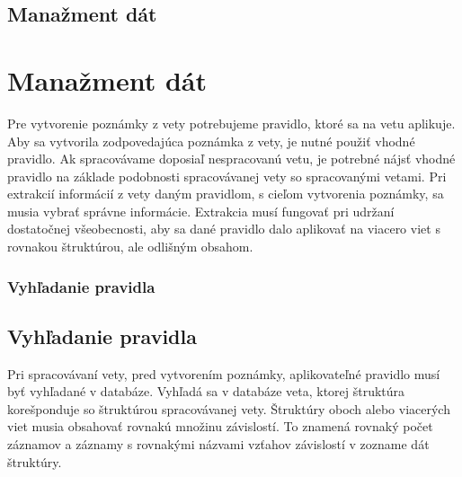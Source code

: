%
%
{
	\subsection{Manažment dát}
}
{
	\section{Manažment dát}
}
\label{subsection:data_management}
Pre vytvorenie poznámky z vety potrebujeme pravidlo, ktoré sa na vetu aplikuje. Aby sa vytvorila zodpovedajúca poznámka z vety, je nutné použiť vhodné pravidlo. Ak spracovávame doposiaľ nespracovanú vetu, je potrebné nájsť vhodné pravidlo na základe podobnosti spracovávanej vety so spracovanými vetami. Pri extrakcií informácií z vety daným pravidlom, s cieľom vytvorenia poznámky, sa musia vybrať správne informácie. Extrakcia musí fungovať pri udržaní dostatočnej všeobecnosti, aby sa dané pravidlo dalo aplikovať na viacero viet s rovnakou štruktúrou, ale odlišným obsahom.

%
%
{
	\subsubsection{Vyhľadanie pravidla}
}
{
	\subsection{Vyhľadanie pravidla}
}

\label{subsubsection:rule_lookup}
Pri spracovávaní vety, pred vytvorením poznámky, aplikovateľné pravidlo musí byť vyhľadané v databáze. Vyhľadá sa v databáze veta, ktorej štruktúra korešponduje so štruktúrou spracovávanej vety. Štruktúry oboch alebo viacerých viet musia obsahovať rovnakú množinu závislostí. To znamená rovnaký počet záznamov a záznamy s rovnakými názvami vzťahov závislostí v zozname dát štruktúry.

